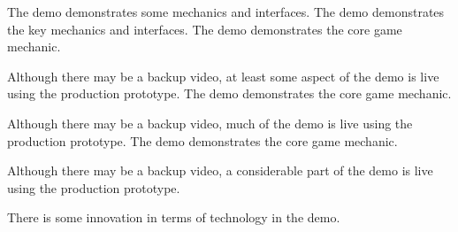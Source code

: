 \documentclass{../fal_assignment}
\begin{document}
\begin{markingrubric}
        \grade The demo demonstrates some mechanics and interfaces.
        \grade The demo demonstrates the key mechanics and interfaces.
        \grade The demo demonstrates the core game mechanic.
            \par Although there may be a backup video, at least some aspect of the demo is live using the production prototype.
        \grade The demo demonstrates the core game mechanic.
            \par Although there may be a backup video, much of the demo is live using the production prototype.
        \grade The demo demonstrates the core game mechanic.
            \par Although there may be a backup video, a considerable part of the demo is live using the production prototype.
            \par There is some innovation in terms of technology in the demo.
\end{markingrubric}
\end{document}
